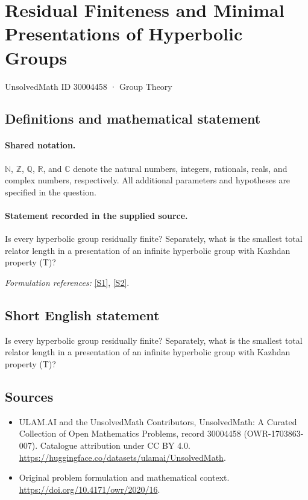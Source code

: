 \documentclass[11pt]{article}
\newcommand{\sref}[2]{\hyperlink{source:#1:#2}{[S#2]}}
\begin{document}
\setcounter{section}{30004457}
\section{Residual Finiteness and Minimal Presentations of Hyperbolic Groups}\label{30004458}
{\small UnsolvedMath ID 30004458 · Group Theory}
\subsection{Definitions and mathematical statement}

\paragraph{Shared notation.}$\mathbb N$, $\mathbb Z$, $\mathbb Q$, $\mathbb R$, and $\mathbb C$ denote the natural numbers, integers, rationals, reals, and complex numbers, respectively. All additional parameters and hypotheses are specified in the question.


\paragraph{Statement recorded in the supplied source.}
Is every hyperbolic group residually finite? Separately, what is the smallest total relator length in a presentation of an infinite hyperbolic group with Kazhdan property (T)?
\par\smallskip\textit{Formulation references:} \sref{30004458}{1}, \sref{30004458}{2}.
\subsection{Short English statement}
Is every hyperbolic group residually finite? Separately, what is the smallest total relator length in a presentation of an infinite hyperbolic group with Kazhdan property (T)?
\subsection{Sources}
\begin{itemize}
\item[\hypertarget{source:30004458:1}{S1}] ULAM.AI and the UnsolvedMath Contributors, UnsolvedMath: A Curated Collection of Open Mathematics Problems, record 30004458 (OWR-1703863-007). Catalogue attribution under CC BY 4.0.
\url{https://huggingface.co/datasets/ulamai/UnsolvedMath}.
\item[\hypertarget{source:30004458:2}{S2}] Original problem formulation and mathematical context.
\url{https://doi.org/10.4171/owr/2020/16}.
\end{itemize}
\label{end:30004458}
\end{document}
